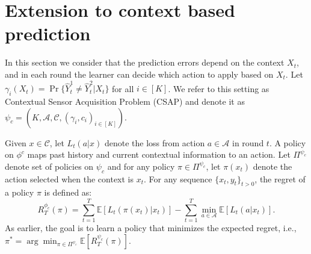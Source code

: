 \documentclass{article}
\begin{document}
%
%
%
%
%

\section{Extension to context based prediction}
\label{sec:Contextual}
In this section we consider that the prediction errors depend on the context $X_t$, and in each round the learner can decide which action to apply based on $X_t$. Let  $\gamma_i(X_t)=\Pr\{\hat{Y}^1_t \neq \hat{Y}^2_t| X_t\}$ for all $i \in [K]$. We refer to this setting as  Contextual Sensor Acquisition Problem (CSAP) and denote it as $\psi_c=(K, \mathcal{A}, \mathcal{C}, (\gamma_i,c_i)_{i\in [K]})$. 

Given $x \in \mathcal{C}$, let $L_t(a|x)$ denote the loss from action $a\in \mathcal{A}$ in round $t$. A policy on $\phi^c$ maps past history and current contextual information to an action. Let $\Pi^{\psi_c}$ denote set of policies on $\psi_c$ and for any policy $\pi \in \Pi^{\psi_c}$, let $\pi(x_t)$ denote the action selected when the context is $x_t$. For any sequence $\{x_t,y_t\}_{t>0}$, the regret of a policy $\pi$ is defined as:
\begin{equation}
R^{\phi_c}_T(\pi)= \sum_{t=1}^{T} \mathbb{E}\left [L_t(\pi(x_t)|x_t)\right ]-\sum_{t=1}^{T}\min_{a \in \mathcal{A}} \mathbb{E} \left [ L_t(a|x_t)\right ]. 
\end{equation}
As earlier, the goal is to learn a policy that minimizes the expected regret, i.e., $\pi^*= \arg \min_{\pi \in \Pi^{\psi_c}} \mathbb{E}[R^{\psi_c}_T(\pi)].$
\end{document}

